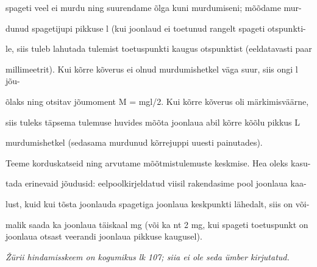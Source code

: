 spageti veel ei murdu ning suurendame õlga kuni murdumiseni; mõõdame mur-

dunud spagetijupi pikkuse l (kui joonlaud ei toetunud rangelt spageti otspunkti-

le, siis tuleb lahutada tulemist toetuspunkti kaugus otspunktist (eeldatavasti paar

millimeetrit). Kui kõrre kõverus ei olnud murdumishetkel väga suur, siis ongi l jõu-

õlaks ning otsitav jõumoment M = mgl/2. Kui kõrre kõverus oli märkimisväärne,

siis tuleks täpsema tulemuse huvides mõõta joonlaua abil kõrre kõõlu pikkus L

murdumishetkel (sedasama murdunud kõrrejuppi uuesti painutades).

Teeme korduskatseid ning arvutame mõõtmistulemuste keskmise. Hea oleks kasu-

tada erinevaid jõudusid: eelpoolkirjeldatud viisil rakendasime pool joonlaua kaa-

lust, kuid kui tõsta joonlauda spagetiga joonlaua keskpunkti lähedalt, siis on või-

malik saada ka joonlaua täiskaal mg (või ka nt 2 mg, kui spageti toetuspunkt on joonlaua otsast veerandi joonlaua pikkuse kaugusel).

\textit{Žürii hindamisskeem on kogumikus lk 107; siia ei ole seda ümber kirjutatud.}
\probend
